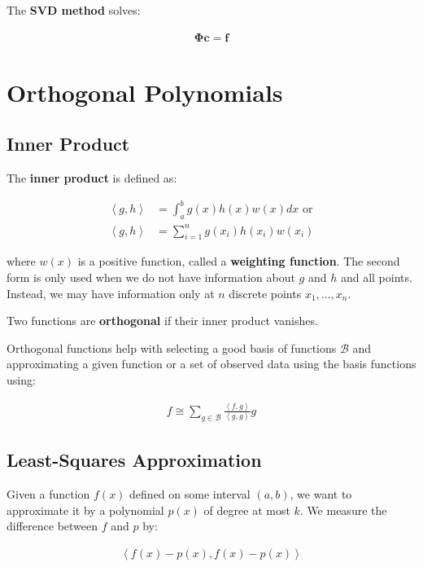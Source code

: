 \documentclass[11pt]{article}
\begin{document}
The \textbf{SVD method} solves:

\begin{align*}
    \boldsymbol{\Phi}\boldsymbol{c} = \boldsymbol{f}
\end{align*}

\section{Orthogonal Polynomials}
\label{sec:org4ba97d0}
\subsection{Inner Product}
\label{sec:org38a68a5}
The \textbf{inner product} is defined as:

\begin{align*}
    \left\langle g,h \right\rangle &= \int_{a}^{b}g\left(x\right)h\left(x\right)w\left(x\right) dx \text{  or} \\
    \left\langle g,h \right\rangle &= \sum_{i=1}^{n}g\left(x_{i}\right)h\left(x_{i}\right)w\left(x_{i}\right)
\end{align*}

where \(w\left(x\right)\) is a positive function, called a \textbf{weighting function}. The second form is only used when we do not have information about \(g\) and \(h\) and all points. Instead, we may have information only at \(n\) discrete points \(x_{1}, \ldots, x_{n}\).

Two functions are \textbf{orthogonal} if their inner product vanishes.

Orthogonal functions help with selecting a good basis of functions \(\mathcal{B}\) and approximating a given function or a set of observed data using the basis functions using:

\begin{align*}
f \cong \sum_{g\in\mathcal{B}} \frac{\left\langle f,g \right\rangle}{\left\langle g,g \right\rangle}g
\end{align*}

\subsection{Least-Squares Approximation}
\label{sec:org4828e5c}
Given a function \(f\left(x\right)\) defined on some interval \(\left(a,b\right)\), we want to approximate it by a polynomial \(p\left(x\right)\) of degree at most \(k\). We measure the difference between \(f\) and \(p\) by:

\begin{align*}
    \left\langle f\left(x\right) - p\left(x\right), f\left(x\right) - p\left(x\right)\right\rangle
\end{align*}
\end{document}
